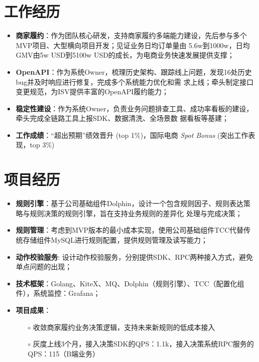 \documentclass{resume}
\begin{document}
\section{工作经历}
\begin{itemize}[parsep=0.3ex] \normalsize
    \item \textbf{商家履约}：作为团队核心研发，支持商家履约多端能力建设，先后参与多个MVP项目、大型横向项目开发；见证业务日均订单量由
    5.6w到1000w，日均GMV由5w USD到5100w USD的成长，为电商业务快速发展提供支撑；
    \item \textbf{OpenAPI}：作为系统Owner，梳理历史架构、跟踪线上问题，发现16处历史bug并及时响应进行修复，完成多个系统能力优化和需
    求上线；牵头制定接口变更规范，为ISV提供丰富的OpenAPI履约能力；
    \item \textbf{稳定性建设}：作为系统Owner，负责业务问题排查工具、成功率看板的建设，牵头完成全链路工具上报SDK、数据清洗、全场景数
    据看板等基建；
    \item \textbf{工作成绩}：“超出预期”绩效晋升 (top 1\%)，国际电商 \textit{Spot Bonus} (突出工作表现，top 3\%)
\end{itemize}

\section{项目经历}
\begin{itemize}[parsep=0.3ex] \normalsize
    \item \textbf{规则引擎}：基于公司基础组件Dolphin，设计一个包含规则因子、规则表达策略与规则决策的规则引擎，旨在支持业务规则的差异化
    处理与完成决策；
    \item \textbf{规则管理}：考虑到MVP版本的最小成本实现，使用公司基础组件TCC代替传统存储组件MySQL进行规则配置，提供规则管理及读写能力；
    \item \textbf{动作校验服务}: 设计动作校验服务，分别提供SDK、RPC两种接入方式，避免单点问题的出现；
    \item \textbf{技术框架}：Golang、KiteX、MQ、Dolphin（规则引擎）、TCC（配置化组件），系统监控：Grafana；
    \item \textbf{项目成果}：
      \begin{itemize}
        \item[$\circ$] 收敛商家履约业务决策逻辑，支持未来新规则的低成本接入
        \item[$\circ$] 灰度上线3个月，接入决策SDK的QPS：1.1k，接入决策系统RPC服务的QPS：115（B端业务）
      \end{itemize}
\end{itemize}
\end{document}
